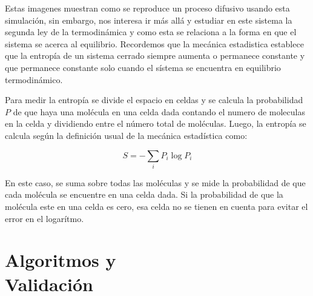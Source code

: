 \documentclass[12pt,twocolumn]{article}
\begin{document}
Estas imagenes muestran como se reproduce un proceso difusivo usando esta simulación, sin embargo, nos interesa ir más allá y estudiar en este sistema la segunda ley de la termodinámica y como esta se relaciona a la forma en que el sistema se acerca al equilibrio. Recordemos que la mecánica estadistica establece que la entropía de un sistema cerrado siempre aumenta o permanece constante y que permanece constante solo cuando el sístema se encuentra en equilibrio termodinámico.

Para medir la entropía se divide el espacio en celdas y se calcula la probabilidad $P$ de que haya una molécula en una celda dada contando el numero de moleculas en la celda y dividiendo entre el número total de moléculas. Luego, la entropía se calcula según la definición usual de la mecánica estadística como: 

\begin{equation} \label{eq: Entropy}
	S = - \sum _i P_i \log{P_i}
\end{equation}

En este caso, se suma sobre todas las moléculas y se mide la probabilidad de que cada molécula se encuentre en una celda dada. Si la probabilidad de que la molécula este en una celda es cero, esa celda no se tienen en cuenta para evitar el error en el logarítmo. 
\section{Algoritmos y \\ Validación}
\end{document}
